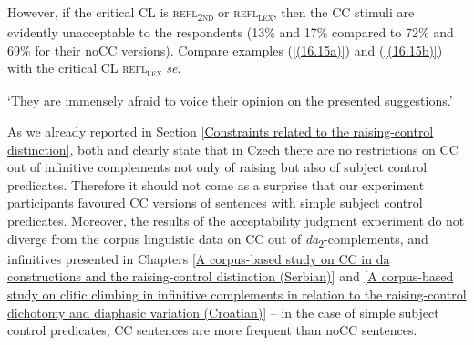 \noindent However, if the critical CL is \textsc{refl\textsubscript{2nd}} or \textsc{refl\textsubscript{\textsc{lex}}}, then the CC stimuli are evidently unacceptable to the respondents (13\% and 17\% compared to 72\% and 69\% for their noCC versions). Compare examples (\ref{(16.15a)}) and (\ref{(16.15b)}) with the critical CL \textsc{refl\textsubscript{\textsc{lex}}} \textit{se}.

\begin{exe}\ex
\begin{xlist}
\end{xlist}
\glt‘They are immensely afraid to voice their opinion on the presented suggestions.’
\end{exe}

\noindent As we already reported in Section \ref{Constraints related to the raising-control distinction}, both \citet[][]{Rezac05} and \citet[][]{Hana07} clearly state that in Czech there are no restrictions on CC out of infinitive complements not only of raising but also of subject control predicates. Therefore it should not come as a surprise that our experiment participants favoured CC versions of sentences with simple subject control predicates. Moreover, the results of the acceptability judgment experiment do not diverge from the corpus linguistic data on CC out of \textit{da}\textsubscript{2}-complements, and infinitives presented in Chapters \ref{A corpus-based study on CC in da constructions and the raising-control distinction (Serbian)} and \ref{A corpus-based study on clitic climbing in infinitive complements in relation to the raising-control dichotomy and diaphasic variation (Croatian)} – in the case of simple subject control predicates, CC sentences are more frequent than noCC sentences. 

